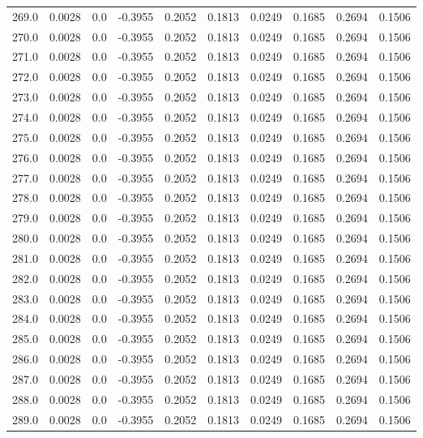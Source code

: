 \begin{longtable}{lrrrrrrrrr}
269.0 & 0.0028 & 0.0 & -0.3955 & 0.2052 & 0.1813 & 0.0249 & 0.1685 & 0.2694 & 0.1506 \\
270.0 & 0.0028 & 0.0 & -0.3955 & 0.2052 & 0.1813 & 0.0249 & 0.1685 & 0.2694 & 0.1506 \\
271.0 & 0.0028 & 0.0 & -0.3955 & 0.2052 & 0.1813 & 0.0249 & 0.1685 & 0.2694 & 0.1506 \\
272.0 & 0.0028 & 0.0 & -0.3955 & 0.2052 & 0.1813 & 0.0249 & 0.1685 & 0.2694 & 0.1506 \\
273.0 & 0.0028 & 0.0 & -0.3955 & 0.2052 & 0.1813 & 0.0249 & 0.1685 & 0.2694 & 0.1506 \\
274.0 & 0.0028 & 0.0 & -0.3955 & 0.2052 & 0.1813 & 0.0249 & 0.1685 & 0.2694 & 0.1506 \\
275.0 & 0.0028 & 0.0 & -0.3955 & 0.2052 & 0.1813 & 0.0249 & 0.1685 & 0.2694 & 0.1506 \\
276.0 & 0.0028 & 0.0 & -0.3955 & 0.2052 & 0.1813 & 0.0249 & 0.1685 & 0.2694 & 0.1506 \\
277.0 & 0.0028 & 0.0 & -0.3955 & 0.2052 & 0.1813 & 0.0249 & 0.1685 & 0.2694 & 0.1506 \\
278.0 & 0.0028 & 0.0 & -0.3955 & 0.2052 & 0.1813 & 0.0249 & 0.1685 & 0.2694 & 0.1506 \\
279.0 & 0.0028 & 0.0 & -0.3955 & 0.2052 & 0.1813 & 0.0249 & 0.1685 & 0.2694 & 0.1506 \\
280.0 & 0.0028 & 0.0 & -0.3955 & 0.2052 & 0.1813 & 0.0249 & 0.1685 & 0.2694 & 0.1506 \\
281.0 & 0.0028 & 0.0 & -0.3955 & 0.2052 & 0.1813 & 0.0249 & 0.1685 & 0.2694 & 0.1506 \\
282.0 & 0.0028 & 0.0 & -0.3955 & 0.2052 & 0.1813 & 0.0249 & 0.1685 & 0.2694 & 0.1506 \\
283.0 & 0.0028 & 0.0 & -0.3955 & 0.2052 & 0.1813 & 0.0249 & 0.1685 & 0.2694 & 0.1506 \\
284.0 & 0.0028 & 0.0 & -0.3955 & 0.2052 & 0.1813 & 0.0249 & 0.1685 & 0.2694 & 0.1506 \\
285.0 & 0.0028 & 0.0 & -0.3955 & 0.2052 & 0.1813 & 0.0249 & 0.1685 & 0.2694 & 0.1506 \\
286.0 & 0.0028 & 0.0 & -0.3955 & 0.2052 & 0.1813 & 0.0249 & 0.1685 & 0.2694 & 0.1506 \\
287.0 & 0.0028 & 0.0 & -0.3955 & 0.2052 & 0.1813 & 0.0249 & 0.1685 & 0.2694 & 0.1506 \\
288.0 & 0.0028 & 0.0 & -0.3955 & 0.2052 & 0.1813 & 0.0249 & 0.1685 & 0.2694 & 0.1506 \\
289.0 & 0.0028 & 0.0 & -0.3955 & 0.2052 & 0.1813 & 0.0249 & 0.1685 & 0.2694 & 0.1506 \\

\end{longtable}

